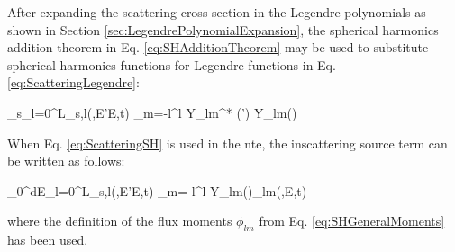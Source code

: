 After expanding the scattering cross section in the Legendre polynomials as shown in Section \ref{sec:LegendrePolynomialExpansion}, the spherical harmonics addition theorem in Eq. \eqref{eq:SHAdditionTheorem} may be used to substitute spherical harmonics functions for Legendre functions in Eq. \eqref{eq:ScatteringLegendre}:

\beq
\label{eq:ScatteringSH}
\Sigma_s\seatout \equiv\sum_{l=0}^L\Sigma_{s,l}(,E'\rightarrow E,t) \sum_{m=-l}^{l} Y_{lm}^{*} (\hO  ') Y_{lm}(\hO  )
\eeq

When Eq. \eqref{eq:ScatteringSH} is used in the \gls{nte}, the inscattering source term can be written as follows:

\beq
\label{eq:SHInscattering}
\int_0^\infty dE\sum_{l=0}^L\Sigma_{s,l}(,E'\rightarrow E,t) \sum_{m=-l}^{l}  Y_{lm}(\hO  )\phi_{lm}(,E,t)
\eeq

 where the definition of the flux moments \(\phi_{lm}\) from Eq. \eqref{eq:SHGeneralMoments} has been used.